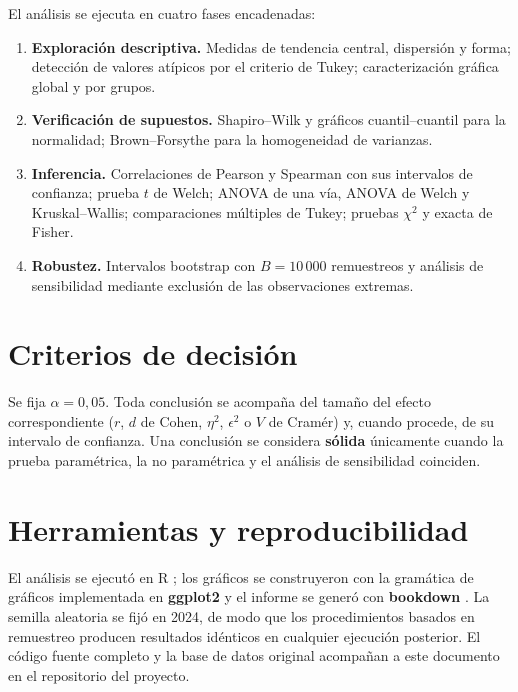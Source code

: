 \documentclass[
]{book}
\providecommand{\tightlist}{%
  \setlength{\itemsep}{0pt}\setlength{\parskip}{0pt}}
\begin{document}
El análisis se ejecuta en cuatro fases encadenadas:

\begin{enumerate}
\def\labelenumi{\arabic{enumi}.}
\tightlist
\item
  \textbf{Exploración descriptiva.} Medidas de tendencia central, dispersión y forma; detección de
  valores atípicos por el criterio de Tukey; caracterización gráfica global y por grupos.
\item
  \textbf{Verificación de supuestos.} Shapiro--Wilk y gráficos cuantil--cuantil para la normalidad;
  Brown--Forsythe para la homogeneidad de varianzas.
\item
  \textbf{Inferencia.} Correlaciones de Pearson y Spearman con sus intervalos de confianza;
  prueba \(t\) de Welch; ANOVA de una vía, ANOVA de Welch y Kruskal--Wallis; comparaciones
  múltiples de Tukey; pruebas \(\chi^2\) y exacta de Fisher.
\item
  \textbf{Robustez.} Intervalos bootstrap con \(B = 10\,000\) remuestreos y análisis de sensibilidad
  mediante exclusión de las observaciones extremas.
\end{enumerate}

\section{Criterios de decisión}\label{criterios-de-decisiuxf3n}

Se fija \(\alpha = 0{,}05\). Toda conclusión se acompaña del tamaño del efecto correspondiente
(\(r\), \(d\) de Cohen, \(\eta^2\), \(\epsilon^2\) o \(V\) de Cramér) y, cuando procede, de su intervalo
de confianza. Una conclusión se considera \textbf{sólida} únicamente cuando la prueba paramétrica,
la no paramétrica y el análisis de sensibilidad coinciden.

\section{Herramientas y reproducibilidad}\label{herramientas-y-reproducibilidad}

El análisis se ejecutó en R \citep{rcore}; los gráficos se construyeron con la gramática de
gráficos implementada en \textbf{ggplot2} \citep{ggplot2} y el informe se generó con \textbf{bookdown}
\citep{bookdown}. La semilla aleatoria se fijó en 2024, de modo que los procedimientos basados en
remuestreo producen resultados idénticos en cualquier ejecución posterior. El código fuente
completo y la base de datos original acompañan a este documento en el repositorio del
proyecto.
\end{document}
